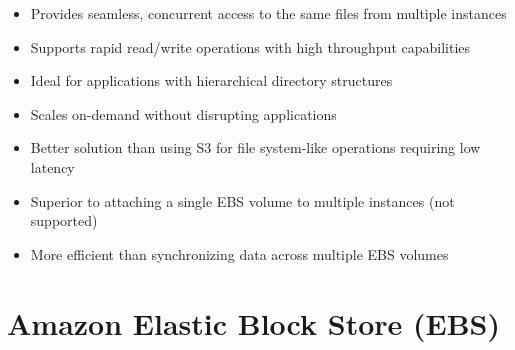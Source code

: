\documentclass[11pt,a4paper]{report}
\begin{document}
\begin{itemize}
\begin{itemize}
\begin{itemize}
  \item Create an Amazon EFS file system and mount it from each EC2 instance
  \item Configure applications to use the shared file system for data storage
\end{itemize}
  \item Provides seamless, concurrent access to the same files from multiple instances
  \item Supports rapid read/write operations with high throughput capabilities
  \item Ideal for applications with hierarchical directory structures
  \item Scales on-demand without disrupting applications
  \item Better solution than using S3 for file system-like operations requiring low latency
  \item Superior to attaching a single EBS volume to multiple instances (not supported)
  \item More efficient than synchronizing data across multiple EBS volumes
\end{itemize}
\end{itemize}

\section{Amazon Elastic Block Store (EBS)}
\end{document}
